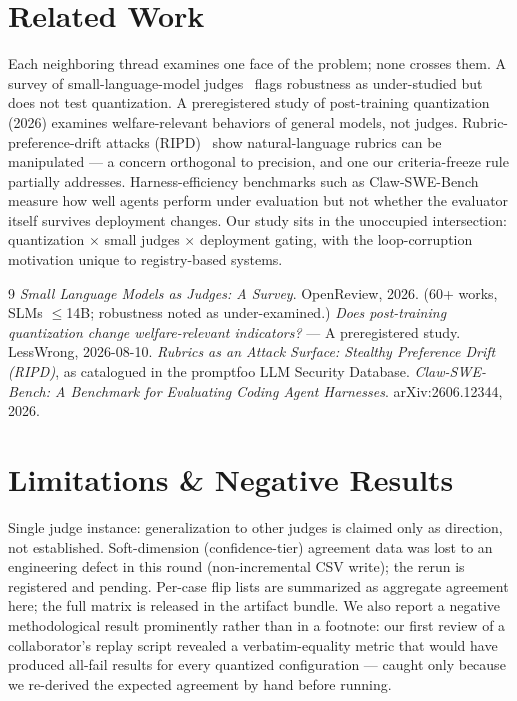 \documentclass[11pt]{article}
\begin{document}
\section{Related Work}
Each neighboring thread examines one face of the problem; none crosses them.
A survey of small-language-model judges~\cite{slmsurvey} flags robustness as
under-studied but does not test quantization. A preregistered study of
post-training quantization~\cite{ptqwelfare} (2026) examines welfare-relevant
behaviors of general models, not judges. Rubric-preference-drift attacks
(RIPD)~\cite{ripd} show natural-language rubrics can be manipulated --- a
concern orthogonal to precision, and one our criteria-freeze rule partially
addresses. Harness-efficiency benchmarks such as Claw-SWE-Bench~\cite{clawswebench}
measure how well agents perform under evaluation but not whether the evaluator
itself survives deployment changes. Our study sits in the unoccupied
intersection: quantization $\times$ small judges $\times$ deployment gating,
with the loop-corruption motivation unique to registry-based systems.

\begin{thebibliography}{9}
 \emph{Small Language Models as Judges: A Survey}. OpenReview, 2026. (60+ works, SLMs $\leq$14B; robustness noted as under-examined.)
 \emph{Does post-training quantization change welfare-relevant indicators?} --- A preregistered study. LessWrong, 2026-08-10.
 \emph{Rubrics as an Attack Surface: Stealthy Preference Drift (RIPD)}, as catalogued in the promptfoo LLM Security Database.
 \emph{Claw-SWE-Bench: A Benchmark for Evaluating Coding Agent Harnesses}. arXiv:2606.12344, 2026.
\end{thebibliography}

\section{Limitations \& Negative Results}
Single judge instance: generalization to other judges is claimed only as
direction, not established. Soft-dimension (confidence-tier) agreement data was
lost to an engineering defect in this round (non-incremental CSV write); the
rerun is registered and pending. Per-case flip lists are summarized as aggregate
agreement here; the full matrix is released in the artifact bundle. We also
report a negative methodological result prominently rather than in a footnote:
our first review of a collaborator's replay script revealed a verbatim-equality
metric that would have produced all-fail results for every quantized
configuration --- caught only because we re-derived the expected agreement by
hand before running.
\end{document}
